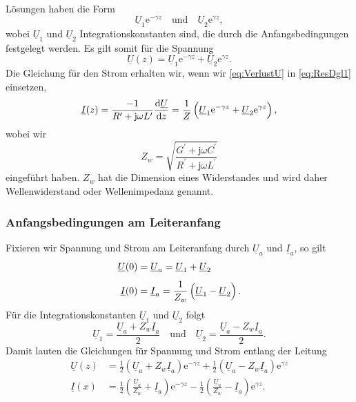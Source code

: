 \documentclass[paper=a4, parskip=half-, ngerman, fontsize=11pt]{scrreprt}
\begin{document}
Lösungen haben die Form
\[ \underline{U}_{1} \mathrm{e}^{- \gamma z} \quad \text{und} \quad \underline{U}_{2} \mathrm{e}^{\gamma z}, \]
wobei $\underline{U}_{1}$ und $\underline{U}_{2}$ Integrationskonstanten sind, die durch die Anfangsbedingungen
festgelegt werden. Es gilt somit für die Spannung
\begin{equation}
    \underline{U}(z) = \underline{U}_{1} \mathrm{e}^{- \gamma z}
     +
     \underline{U}_{2} \mathrm{e}^{\gamma z} \label{eq:VerlustU}.
\end{equation}
Die Gleichung für den Strom erhalten wir, wenn wir \eqref{eq:VerlustU} in \eqref{eq:ResDgl1} einsetzen,
\begin{equation}
    \underline{I}(z) = \frac{-1}{R^{\prime} + \mathrm{j} \omega L^{\prime}} \frac{\text{d} \underline{U}}{\text{d} z}
    = \frac{1}{Z}
    \left(
    \vphantom{\sqrt{1}{Z}}
    \underline{U}_{1} \mathrm{e}^{- \gamma z} + \underline{U}_{2} \mathrm{e}^{\gamma z} \right),
\end{equation}
wobei wir
\begin{equation}
    Z_{w} = \sqrt{\frac{G^{\prime} + \mathrm{j} \omega C^{\prime}}{R^{\prime} + \mathrm{j} \omega L^{\prime}}}
    \label{eq:Zw}
\end{equation}
eingeführt haben. $Z_{w}$ hat die Dimension eines Widerstandes und wird daher Wellenwiderstand oder Wellenimpedanz
genannt.

\subsubsection{Anfangsbedingungen am Leiteranfang}

Fixieren wir Spannung und Strom am Leiteranfang durch $\underline{U}_{a}$ und $\underline{I}_{a}$, so gilt
\begin{align*}
    \underline{U}(0) &= \underline{U}_{a} = \underline{U}_{1} + \underline{U}_{2} \\[1ex]
    \underline{I}(0) &= \underline{I}_{a} = \frac{1}{Z_{w}}
    \left(
    \vphantom{\sqrt{1}{Z_{w}}}
    \underline{U}_{1} - \underline{U}_{2} \right).
\end{align*}
Für die Integrationskonstanten $\underline{U}_{1}$ und $\underline{U}_{2}$ folgt
\[ \underline{U}_{1} = \frac{\underline{U}_{a} + Z_{w} \underline{I}_{a}}{2} \quad \text{und} \quad \underline{U}_{2} =
\frac{\underline{U}_{a} - Z_{w} \underline{I}_{a}}{2}. \]
Damit lauten die Gleichungen für Spannung und Strom entlang der Leitung
\begin{align}
    \underline{U}(z) &=
    \frac{1}{2} \left( \underline{U}_{a} + Z_{w} \underline{I}_{a} \right) \mathrm{e}^{- \gamma z}
    +
    \frac{1}{2} \left( \underline{U}_{a} - Z_{w} \underline{I}_{a} \right) \mathrm{e}^{\gamma z} \label{eq:UxA} \\[1ex]
    \underline{I}(x) &=
    \frac{1}{2} \left( \frac{\underline{U}_{a}}{Z_{w}} + \underline{I}_{a} \right) \mathrm{e}^{- \gamma z}
    -
    \frac{1}{2} \left( \frac{\underline{U}_{a}}{Z_{w}} - \underline{I}_{a} \right) \mathrm{e}^{\gamma z} \label{eq:IxA}
    .
\end{align}
\end{document}
